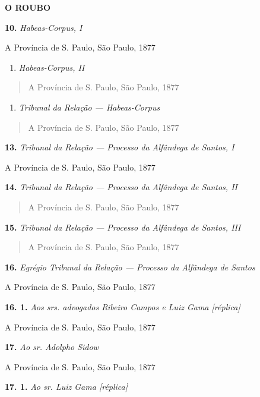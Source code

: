 \textbf{O ROUBO}

\textbf{10.} \emph{Habeas-Corpus, I}

A Província de S. Paulo, São Paulo, 1877

\begin{enumerate}
\def\labelenumi{\arabic{enumi}.}
\setcounter{enumi}{10}
\item
  \emph{Habeas-Corpus, II}
\end{enumerate}

\begin{quote}
A Província de S. Paulo, São Paulo, 1877
\end{quote}

\begin{enumerate}
\def\labelenumi{\arabic{enumi}.}
\setcounter{enumi}{10}
\item
  \emph{Tribunal da Relação --- Habeas-Corpus}
\end{enumerate}

\begin{quote}
A Província de S. Paulo, São Paulo, 1877
\end{quote}

\textbf{13.} \emph{Tribunal da Relação --- Processo da Alfândega de
Santos, I}

A Província de S. Paulo, São Paulo, 1877

\textbf{14.} \emph{Tribunal da Relação --- Processo da Alfândega de
Santos, II}

\begin{quote}
A Província de S. Paulo, São Paulo, 1877
\end{quote}

\textbf{15.} \emph{Tribunal da Relação --- Processo da Alfândega de
Santos, III}

\begin{quote}
A Província de S. Paulo, São Paulo, 1877
\end{quote}

\textbf{16.} \emph{Egrégio Tribunal da Relação --- Processo da Alfândega
de Santos}

A Província de S. Paulo, São Paulo, 1877

\textbf{16. 1.} \emph{Aos srs. advogados Ribeiro Campos e Luiz Gama
{[}réplica{]}}

A Província de S. Paulo, São Paulo, 1877

\textbf{17.} \emph{Ao sr. Adolpho Sidow}

A Província de S. Paulo, São Paulo, 1877

\textbf{17. 1.} \emph{Ao sr. Luiz Gama {[}réplica{]}}

